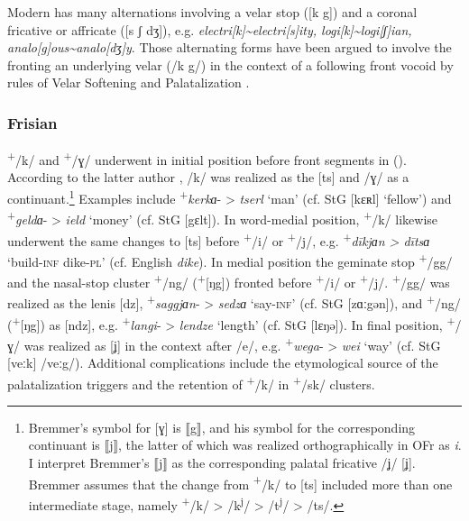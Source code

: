 Modern  has many alternations involving a velar stop ([k g]) and a coronal fricative or affricate ([s ʃ dʒ]), e.g. \textit{electri[k]{\textasciitilde}electri[s]ity, logi[k]{\textasciitilde}logi[ʃ]ian, analo[g]ous{\textasciitilde}analo[dʒ]y}. Those alternating forms have been argued to involve the fronting an underlying velar (/k g/) in the context of a following front vocoid by rules of Velar Softening and Palatalization \citep{ChomskyHalle1968, Borowsky1990, Halle2005}.

\subsubsection{Frisian}
 \textsuperscript{+}/k/ and \textsuperscript{+}/ɣ/ underwent  in initial position before front segments in  (\citealt{Laker2007, Bremmer2009}). According to the latter author \citep[30--31]{Bremmer2009}, /k/ was realized as the  [ts] and /ɣ/ as a continuant.\footnote{{Bremmer’s symbol for [ɣ] is ⟦g⟧, and his symbol for the corresponding continuant is ⟦j⟧, the latter of which was realized orthographically in OFr as} \textrm{\textit{i}}\textrm{. I interpret Bremmer’s ⟦j⟧ as the corresponding palatal fricative /ʝ/ [ʝ]. Bremmer assumes that the change from} \textrm{\textsuperscript{+}}\textrm{/k/ to [ts] included more than one intermediate stage, namely} \textrm{\textsuperscript{+}}\textrm{/k/ > /k}\textrm{\textsuperscript{j}}\textrm{/ > /t}\textrm{\textsuperscript{j}}\textrm{/ > /ts/.}} Examples include \textsuperscript{+}\textit{kerkɑ}{}- > \textit{tserl} ‘man’ (cf. StG [kɛʀl] ‘fellow’) and \textsuperscript{+}\textit{geldɑ}{}- > \textit{ield} ‘money’ (cf. StG [gɛlt]). In word-medial position, \textsuperscript{+}/k/ likewise underwent the same changes to [ts] before \textsuperscript{+}/i/ or \textsuperscript{+}/j/, e.g. \textsuperscript{+}\textit{dīkjɑn > dītsɑ} ‘build-\textsc{inf} dike-\textsc{pl}’ (cf. English \textit{dike}). In medial position the geminate stop \textsuperscript{+}/gg/ and the nasal-stop cluster \textsuperscript{+}/ng/ (\textsuperscript{+}[ŋg]) fronted before \textsuperscript{+}/i/ or \textsuperscript{+}/j/. \textsuperscript{+}/gg/ was realized as the lenis  [dz], \textsuperscript{+}\textit{saggjɑn}{}- > \textit{sedzɑ} ‘say-\textsc{inf}’ (cf. StG [zɑːgən]), and \textsuperscript{+}/ng/ (\textsuperscript{+}[ŋg]) as [ndz], e.g. \textsuperscript{+}\textit{langi}{}- > \textit{lendze} ‘length’ (cf. StG [lɛŋə]). In final position, \textsuperscript{+}/ɣ/ was realized as [ʝ] in the context after /e/, e.g. \textsuperscript{+}\textit{wega}{}- > \textit{wei} ‘way’ (cf. StG [veːk] /veːg/). Additional complications include the etymological source of the palatalization triggers and the retention of \textsuperscript{+}/k/ in \textsuperscript{+}/sk/ clusters.

